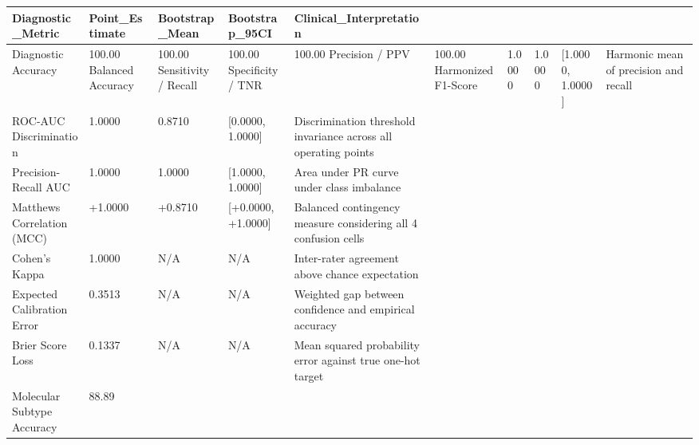 \begin{tabular}{lllll}
\toprule
Diagnostic_Metric & Point_Estimate & Bootstrap_Mean & Bootstrap_95CI & Clinical_Interpretation \\
\midrule
Diagnostic Accuracy & 100.00%
Balanced Accuracy & 100.00%
Sensitivity / Recall & 100.00%
Specificity / TNR & 100.00%
Precision / PPV & 100.00%
Harmonized F1-Score & 1.0000 & 1.0000 & [1.0000, 1.0000] & Harmonic mean of precision and recall \\
ROC-AUC Discrimination & 1.0000 & 0.8710 & [0.0000, 1.0000] & Discrimination threshold invariance across all operating points \\
Precision-Recall AUC & 1.0000 & 1.0000 & [1.0000, 1.0000] & Area under PR curve under class imbalance \\
Matthews Correlation (MCC) & +1.0000 & +0.8710 & [+0.0000, +1.0000] & Balanced contingency measure considering all 4 confusion cells \\
Cohen's Kappa & 1.0000 & N/A & N/A & Inter-rater agreement above chance expectation \\
Expected Calibration Error & 0.3513 & N/A & N/A & Weighted gap between confidence and empirical accuracy \\
Brier Score Loss & 0.1337 & N/A & N/A & Mean squared probability error against true one-hot target \\
Molecular Subtype Accuracy & 88.89%
\bottomrule
\end{tabular}
